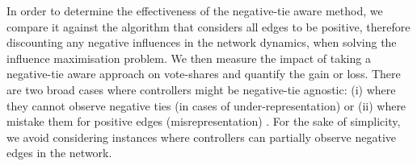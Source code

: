 


  
 

In order to determine the effectiveness of the negative-tie aware method, we compare it against the algorithm that considers all edges to be positive, therefore discounting any negative influences in the network dynamics, when solving the influence maximisation problem. We then measure the impact of taking a negative-tie aware approach on vote-shares and quantify the gain or loss. There are two broad cases where controllers might be negative-tie agnostic: (i) where they cannot observe negative ties (in cases of under-representation) or (ii) where mistake them for positive edges (misrepresentation) \cite{li2013influence}. For the sake of simplicity, we avoid considering instances where controllers can partially observe negative edges in the network.  


